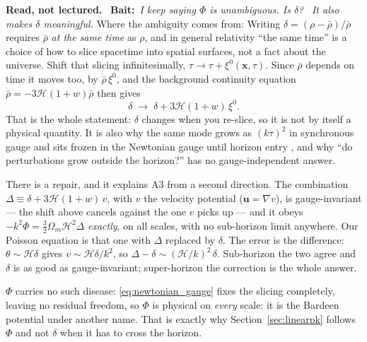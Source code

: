 \documentclass[a4paper,11pt]{article}
\newcommand{\vx}{\bm{x}}
\newcommand{\vu}{\bm{u}}
\def\cH{\mathcal{H}}
\def\Om{\Omega_m}
\numberwithin{equation}{section}
\newenvironment{reading}
  {\par\medskip\noindent\begingroup\small\color{black!58}%
   \textbf{Read, not lectured.}\ }
  {\endgroup\par\medskip}
\newcommand{\bait}[1]{\textbf{Bait:}\ \emph{#1}\ }
\begin{document}
\begin{reading}
\bait{I keep saying $\Phi$ is unambiguous. Is $\delta$?}
\emph{It also makes $\delta$ meaningful.} Where the ambiguity comes from: Writing $\delta = (\rho - \bar\rho)/\bar\rho$ requires
$\bar\rho$ \emph{at the same time} as $\rho$, and in general relativity
``the same time'' is a choice of how to slice spacetime into spatial surfaces,
not a fact about the universe. Shift that slicing infinitesimally,
$\tau \to \tau + \xi^0(\vx,\tau)$. Since $\bar\rho$ depends on time it moves
too, by $\dot{\bar\rho}\,\xi^0$, and the background continuity equation
$\dot{\bar\rho} = -3\cH(1+w)\bar\rho$ then gives
\begin{equation*}
\delta \;\longrightarrow\; \delta + 3\cH(1+w)\,\xi^0 .
\end{equation*}
That is the whole statement: $\delta$ changes when you re-slice, so it is not by
itself a physical quantity. It is also why the same mode grows as $(k\tau)^2$ in
synchronous gauge and sits frozen in the Newtonian gauge until horizon entry
\cite[\S 7]{MaBertschinger1995}, and why ``do perturbations grow outside the
horizon?'' has no gauge-independent answer.

There is a repair, and it explains A3 from a second direction. The combination
$\Delta \equiv \delta + 3\cH(1+w)\,v$, with $v$ the velocity potential
($\vu = \nabla v$), is gauge-invariant --- the shift above cancels against the
one $v$ picks up --- and it obeys
$-k^2\Phi = \tfrac32\Om\cH^2\Delta$ \emph{exactly}, on all scales, with no
sub-horizon limit anywhere. Our Poisson equation is that one with $\Delta$
replaced by $\delta$. The error is the difference: $\theta \sim \cH\delta$ gives
$v \sim \cH\delta/k^2$, so
$\Delta - \delta \sim (\cH/k)^2\,\delta$. Sub-horizon the two agree and $\delta$
is as good as gauge-invariant; super-horizon the correction is the whole answer.

$\Phi$ carries no such disease: \eqref{eq:newtonian_gauge} fixes the slicing
completely, leaving no residual freedom, so $\Phi$ is physical on \emph{every} scale: it is the Bardeen potential under another name. That is exactly why
Section~\ref{sec:linearpk} follows $\Phi$ and not $\delta$ when it has to cross
the horizon.
\end{reading}
\end{document}

